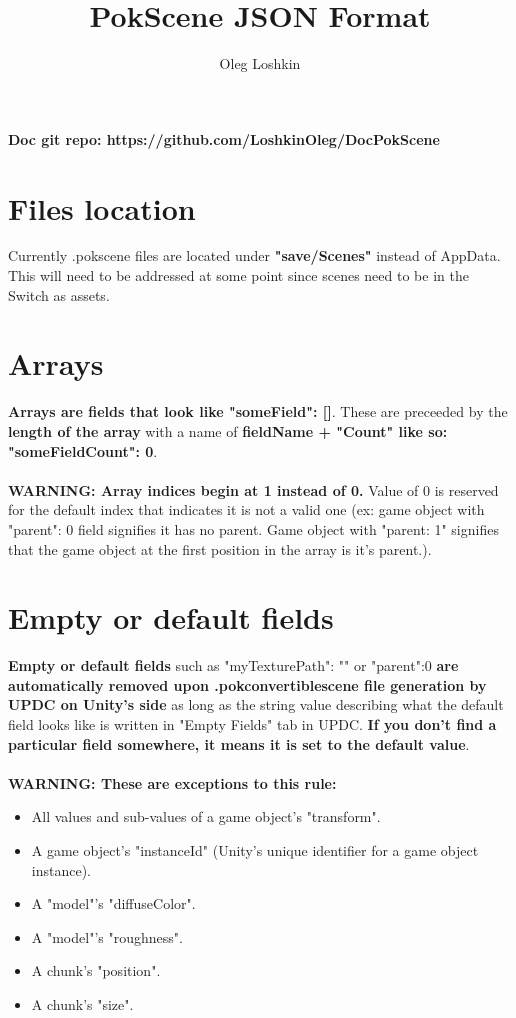 \documentclass[10pt,a4paper]{article}
\author{Oleg Loshkin}
\title{PokScene JSON Format}
\begin{document}
\maketitle
\noindent \textbf{Doc git repo: https://github.com/LoshkinOleg/DocPokScene}

\section{Files location}
Currently .pokscene files are located under \textbf{"save/Scenes"} instead of AppData. This will need to be addressed at some point since scenes need to be in the Switch as assets.

\section{Arrays}
\textbf{Arrays are fields that look like "someField": []}. These are preceeded by the \textbf{length of the array} with a name of \textbf{fieldName + "Count" like so: "someFieldCount": 0}.\\\\
\textbf{WARNING: Array indices begin at 1 instead of 0.} Value of 0 is reserved for the default index that indicates it is not a valid one (ex: game object with "parent": 0 field signifies it has no parent. Game object with "parent: 1" signifies that the game object at the first position in the array is it's parent.).

\section{Empty or default fields}
\textbf{Empty or default fields} such as "myTexturePath": "" or "parent":0 \textbf{are automatically removed upon .pokconvertiblescene file generation by UPDC on Unity's side} as long as the string value describing what the default field looks like is written in "Empty Fields" tab in UPDC. \textbf{If you don't find a particular field somewhere, it means it is set to the default value}.\\\\
\textbf{WARNING: These are exceptions to this rule:}
\begin{itemize}
\item All values and sub-values of a game object's "transform".
\item A game object's "instanceId" (Unity's unique identifier for a game object instance).
\item A "model"'s "diffuseColor".
\item A "model"'s "roughness".
\item A chunk's "position".
\item A chunk's "size". 
\end{itemize}
\end{document}
